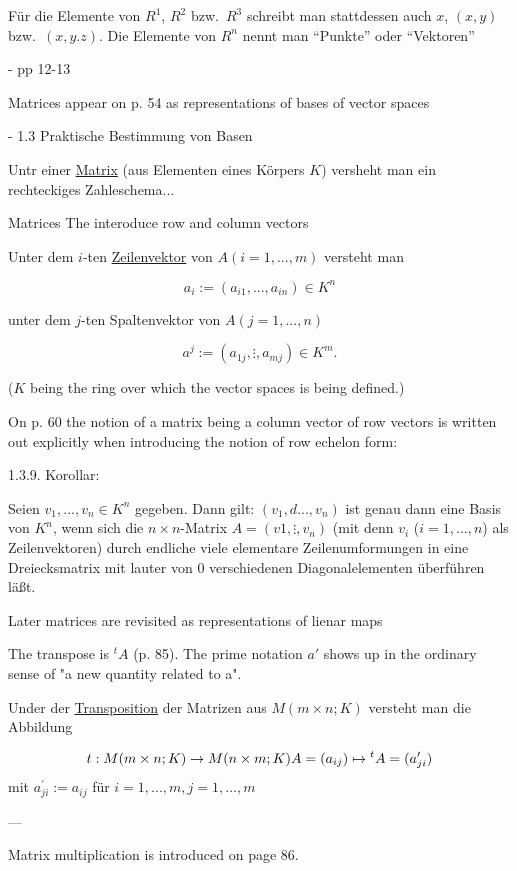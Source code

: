 Für die Elemente von $R^1$, $R^2$ bzw.\ $R^3$ schreibt man stattdessen auch $x$, $(x,y)$ bzw.\ $(x,y.z)$.
Die Elemente von $R^n$ nennt man ``Punkte'' oder ``Vektoren''

- pp 12-13

Matrices appear on p. 54 as representations of bases of vector spaces

- 1.3 Praktische Bestimmung von Basen

Untr einer \underline{Matrix} (aus Elementen eines Körpers $K$)  versheht man ein rechteckiges Zahleschema...

Matrices The interoduce row and column vectors

Unter dem $i$-ten \underline{Zeilenvektor} von $A (i=1, ..., m)$ versteht man

\[
a_i := (a_{i1}, ..., a_{in}) \in K^n
\]

unter dem $j$-ten Spaltenvektor von $A (j=1, ..., n)$

\[
a^j := (a_{1j}, \vdots, a_{mj}) \in K^m.
\]

($K$ being the ring over which the vector spaces is being defined.)

On p. 60 the notion of a matrix being a column vector of row vectors is written out explicitly when introducing the notion of row echelon form:

1.3.9. Korollar:

Seien $v_1, ..., v_n \in K^n$ gegeben. Dann gilt:
$(v_1, d..., v_n)$ ist genau dann eine Basis von $K^n$, wenn sich die $n\times n$-Matrix $A = (v1, \vdots, v_n)$ (mit denn $v_i$ ($i=1,...,n$) als Zeilenvektoren)
durch endliche viele elementare Zeilenumformungen in eine Dreiecksmatrix mit lauter von 0 verschiedenen Diagonalelementen überführen läßt.

Later matrices are revisited as representations of lienar maps

The transpose is ${}^t A$ (p. 85). The prime notation $a'$ shows up in the ordinary sense of "a new quantity related to a".

Under der \underline{Transposition} der Matrizen aus $M(m\times n; K)$ versteht man die Abbildung

\[
t: M(m\times n; K) \rightarrow M(n \times m; K) \\
A = (a_{ij}) \mapsto {}^t A = (a^\prime_{ji})
\]
mit $a^\prime_{ji} := a_{ij}$ für $i=1,...,m, j=1,..., m$

---

Matrix multiplication is introduced on page 86.

